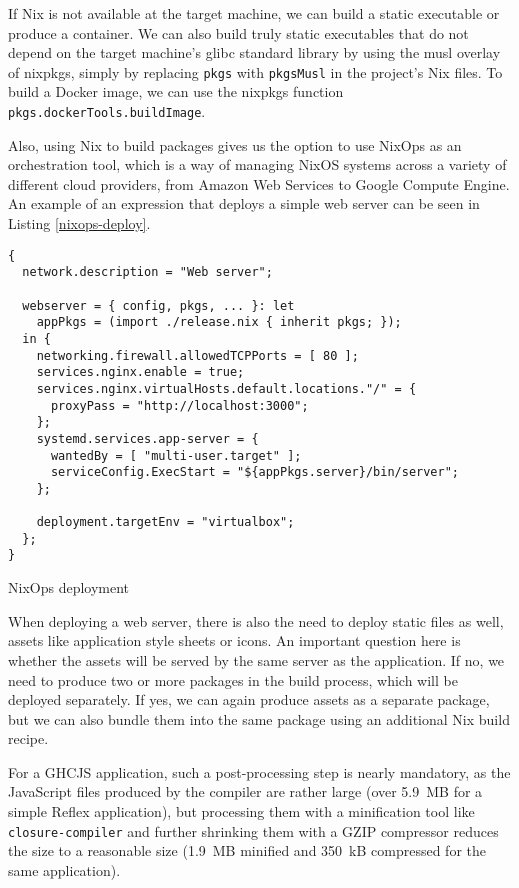 \documentclass[english,odsaz]{fitthesis}
\begin{document}
If Nix is not available at the target machine, we can build a static executable
or produce a container. We can also build truly static executables that do not
depend on the target machine's glibc standard library by using the musl overlay
of nixpkgs, simply by replacing \texttt{pkgs} with \texttt{pkgsMusl} in the project's Nix files.
To build a Docker image, we can use the nixpkgs function
\texttt{pkgs.dockerTools.buildImage}.

Also, using Nix to build packages gives us the option to use NixOps as an
orchestration tool, which is a way of managing NixOS systems across a variety of
different cloud providers, from Amazon Web Services to Google Compute Engine. An
example of an expression that deploys a simple web server can be seen in Listing
\ref{nixops-deploy}.

\begin{listing}[htbp]
\begin{verbatim}
{
  network.description = "Web server";

  webserver = { config, pkgs, ... }: let
    appPkgs = (import ./release.nix { inherit pkgs; });
  in {
    networking.firewall.allowedTCPPorts = [ 80 ];
    services.nginx.enable = true;
    services.nginx.virtualHosts.default.locations."/" = {
      proxyPass = "http://localhost:3000";
    };
    systemd.services.app-server = {
      wantedBy = [ "multi-user.target" ];
      serviceConfig.ExecStart = "${appPkgs.server}/bin/server";
    };

    deployment.targetEnv = "virtualbox";
  };
}
\end{verbatim}
\caption{NixOps deployment \label{nixops-deploy}}
\end{listing}

When deploying a web server, there is also the need to deploy static files as
well, assets like application style sheets or icons. An important question here
is whether the assets will be served by the same server as the application. If
no, we need to produce two or more packages in the build process, which will be
deployed separately. If yes, we can again produce assets as a separate package,
but we can also bundle them into the same package using an additional Nix build
recipe.

For a GHCJS application, such a post-processing step is nearly mandatory, as the
JavaScript files produced by the compiler are rather large (over 5.9~MB for a
simple Reflex application), but processing them with a minification tool like
\texttt{closure-compiler} and further shrinking them with a GZIP compressor reduces the
size to a reasonable size (1.9~MB minified and 350~kB compressed for the same
application).
\end{document}

